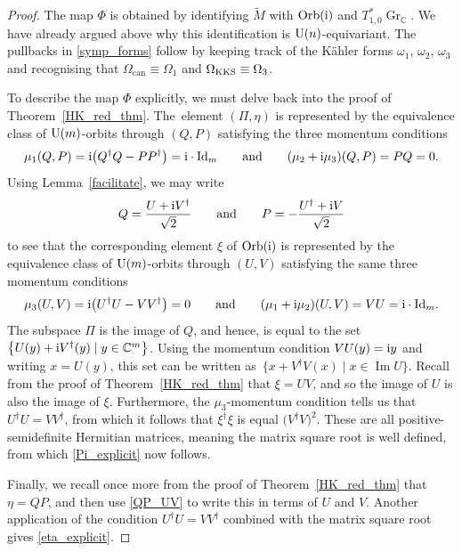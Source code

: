 \documentclass[pdftex]{sigma}
\numberwithin{equation}{section}
\DeclareMathOperator{\Imag}{Im}
\DeclareMathOperator{\Gr}{Gr}
\newcommand{\C}{\mathbb{C}}
\newcommand{\Id}{{\rm Id}}
\begin{document}
\begin{proof}
	The map $\Phi$ is obtained by identifying $\tilde{M}$ with ${\rm Orb}({\rm i})$ and $T^*_{1,0}\Gr_\C$. We have already argued above why this identification is ${\rm U}(n)$-equivariant. The pullbacks in \eqref{symp_forms} follow by keeping track of the K\"{a}hler forms $\omega_1$, $\omega_2$, $\omega_3$ and recognising that $\Omega_\text{can}\equiv\Omega_1$ and $\Omega_{\rm KKS}\equiv\Omega_3$.
	
	To describe the map $\Phi$ explicitly, we must delve back into the proof of Theorem~\ref{HK_red_thm}. The~element $(\Pi,\eta)$ is represented by the equivalence class of ${\rm U}(m)$-orbits through $(Q,P)$ satisfying the three momentum conditions
	\[\mu_1(Q,P)={\rm i}\bigl(Q^\dagger Q-PP^\dagger\bigr)={\rm i}\cdot\Id_m\qquad\text{and}\qquad (\mu_2+{\rm i}\mu_3)(Q,P)=PQ=0.\]
	Using Lemma~\ref{facilitate}, we may write
	\begin{equation}\label{QP_UV}
		Q=\frac{U+{\rm i}V^\dagger}{\sqrt{2}}\qquad\text{and}\qquad P=-\frac{U^\dagger+{\rm i}V}{\sqrt{2}}
	\end{equation}
	to see that the corresponding element $\xi$ of ${\rm Orb}({\rm i})$ is represented by the equivalence class of ${\rm U}(m)$-orbits through $(U,V)$ satisfying the same three momentum conditions
	\begin{equation*}
		\mu_3(U,V)={\rm i}\bigl(U^\dagger U-VV^\dagger\bigr)=0\qquad\text{and}\qquad(\mu_1+{\rm i}\mu_2)(U,V)=VU={\rm i}\cdot\Id_m.
	\end{equation*}
	The subspace $\Pi$ is the image of $Q$, and hence, is equal to the set $\bigl\{U(y)+{\rm i}V^\dagger(y)\mid y\in\C^m\bigr\}$. Using the momentum condition $V U(y)={\rm i}y$ and writing $x= U(y)$, this set can be written as~$\bigl\{x+V^\dagger V(x)\mid x\in\Imag U\bigr\}$. Recall from the proof of Theorem~\ref{HK_red_thm} that $\xi=UV$, and so the image of $U$ is also the image of $\xi$. Furthermore, the $\mu_3$-momentum condition tells us that~${U^\dagger U=VV^\dagger}$, from which it follows that $\xi^\dagger \xi$ is equal $\bigl(V^\dagger V\bigr)^2$. These are all positive-semidefinite Hermitian matrices, meaning the matrix square root is well defined, from which \eqref{Pi_explicit} now follows.
	
Finally, we recall once more from the proof of Theorem~\ref{HK_red_thm} that $\eta=QP$, and then use \eqref{QP_UV} to write this in terms of $U$ and $V$. Another application of the condition $U^\dagger U=VV^\dagger$ combined with the matrix square root gives \eqref{eta_explicit}.	 	
\end{proof}
\end{document}

